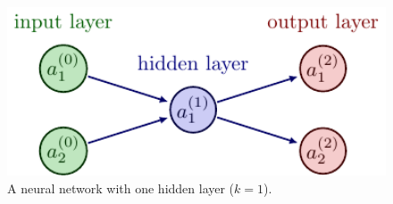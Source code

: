 \documentclass[11pt]{article}
\begin{document}
\begin{figure}[t]
    \centering
    \begin{minipage}{0.6\linewidth}
        \includegraphics[width=1\textwidth]{./figures/neural_nets/MLP_2.pdf}
    \end{minipage}%
    \hfill
    \begin{minipage}{0.39\linewidth}
        \caption{A neural network with one hidden layer ($k=1$).}
        \label{fig:neural_nets_simple_example}
    \end{minipage}
\end{figure}
\end{document}

